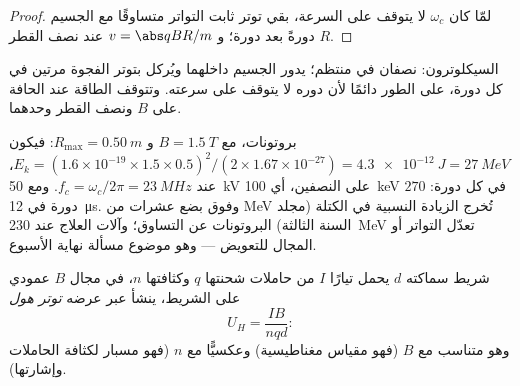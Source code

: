 \begin{proof}
لمّا كان $\omega_c$ لا يتوقف على السرعة، بقي توتر ثابت التواتر
متساوقًا مع الجسيم دورةً بعد دورة؛ و $v = \abs qBR/m$ عند نصف القطر
$R$.
\end{proof}

\begin{omfigure}

{\small السيكلوترون: نصفان في  منتظم؛ يدور
الجسيم داخلهما ويُركل بتوتر الفجوة مرتين
في كل دورة، على الطور دائمًا لأن دوره لا يتوقف على
سرعته. وتتوقف الطاقة عند الحافة على $B$ ونصف القطر وحدهما.}
\end{omfigure}

\begin{example}\label{ex:b1:charged-particles:medical}
بروتونات، مع $B = \qty{1.5}{T}$ و $R_{\max} = \qty{0.50}{m}$: فيكون $E_k =
(1.6\times10^{-19} \times 1.5 \times 0.5)^2/(2 \times 1.67\times10^{-27}) =
\qty{4.3e-12}{J} = \qty{27}{MeV}$، عند $f_c = \omega_c/2\pi = \qty{23}{MHz}$.
ومع \qty{50}{kV} على النصفين، أي \qty{100}{keV} في كل دورة: $270$ دورة في
\qty{12}{\micro s}. وفوق بضع عشرات من \unit{MeV} تُخرج الزيادة النسبية في
الكتلة (مجلد السنة الثالثة) البروتونات عن التساوق؛ وآلات العلاج
عند \qty{230}{MeV} تعدّل التواتر أو المجال للتعويض ---
وهو موضوع مسألة نهاية الأسبوع.
\end{example}

\begin{proposition}\label{prop:b1:charged-particles:hall}
شريط سماكته $d$ يحمل تيارًا $I$ من حاملات شحنتها
$q$ وكثافتها $n$، في مجال $B$ عمودي على الشريط،
ينشأ عبر عرضه \emph{توتر هول}
\[
U_H = \frac{IB}{nqd} :
\]
وهو متناسب مع $B$ (فهو مقياس مغناطيسية) وعكسيًّا مع $n$ (فهو مسبار
لكثافة الحاملات وإشارتها).
\end{proposition}

